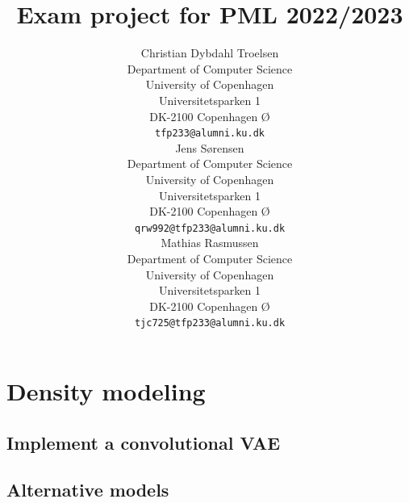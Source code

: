 

\title{Exam project for PML 2022/2023}

\author{ 
	{Christian Dybdahl Troelsen} \\
	Department of Computer Science\\
	University of Copenhagen\\
	Universitetsparken 1 \\
    DK-2100 Copenhagen Ø \\
	\texttt{tfp233@alumni.ku.dk} \\
	\And
	{Jens Sørensen} \\
	Department of Computer Science\\
	University of Copenhagen\\
	Universitetsparken 1 \\
    DK-2100 Copenhagen Ø \\
	\texttt{qrw992@tfp233@alumni.ku.dk} \\
	\And
	{Mathias Rasmussen} \\
	Department of Computer Science\\
	University of Copenhagen\\
	Universitetsparken 1 \\
    DK-2100 Copenhagen Ø \\
	\texttt{tjc725@tfp233@alumni.ku.dk} \\
}

\renewcommand{\headeright}{Report}
\renewcommand{\undertitle}{Report}

\renewcommand{\shorttitle}{PML report}



\maketitle
\section{Density modeling}
\subsection{Implement a convolutional VAE}
\subsection{Alternative models}
